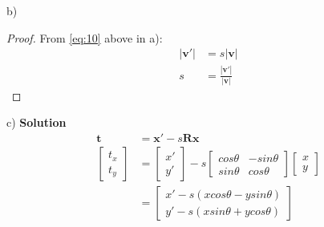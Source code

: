 \documentclass[letterpaper, 11pt]{article}
\begin{document}
b)
\begin{proof}
    From \eqref{eq:10} above in a):
    \begin{align*}
        |\textbf{v}'| & =s|\textbf{v}|                       \\
        s             & = \frac{|\textbf{v}'|}{|\textbf{v}|}
    \end{align*}

\end{proof}

c)
\textbf{Solution}\\
\begin{align*}
    \textbf{t} & = \textbf{x}' - s\textbf{R}\textbf{x} \\
    \begin{bmatrix}
        t_x \\
        t_y
    \end{bmatrix}
               & =
    \begin{bmatrix}
        x' \\
        y'
    \end{bmatrix}
    -s
    \begin{bmatrix}
        cos\theta & -sin\theta \\
        sin\theta & cos\theta
    \end{bmatrix}
    \begin{bmatrix}
        x \\
        y
    \end{bmatrix}                                     \\
               & =
    \begin{bmatrix}
        x' - s(x cos\theta - y sin\theta) \\
        y' - s(x sin\theta + y cos\theta)
    \end{bmatrix}
\end{align*}
\end{document}
